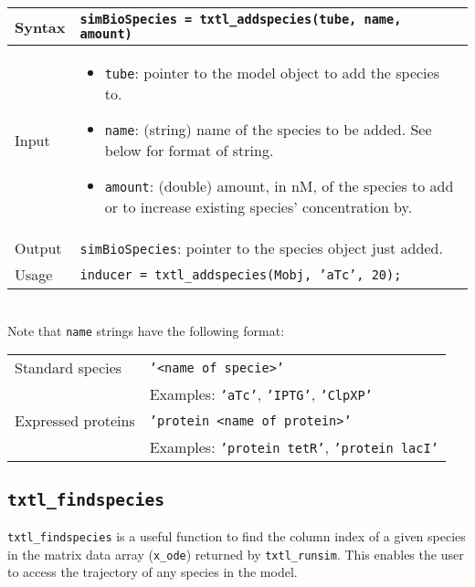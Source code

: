 			\begin{tabular}{p{2cm}|p{13cm}}
			Syntax & \texttt{simBioSpecies = txtl\_addspecies(tube, name, amount)}\\ \hline
			Input &  \begin{itemize}
				\item \texttt{tube}: pointer to the model object to add the species to.
				\item \texttt{name}: (string) name of the species to be added. See below for format of string.  
				\item \texttt{amount}: (double) amount, in nM, of the species to add or to increase existing species' concentration by. 
				\end{itemize} \\ \hline
			Output & \texttt{simBioSpecies}: pointer to the species object just added.\\ \hline
			Usage & \texttt{inducer = txtl\_addspecies(Mobj, 'aTc', 20);}\\
			\end{tabular} \\
			
			
			Note that \texttt{name} strings have the following format: \\
			
			\begin{tabular}{|p{2cm}|p{13cm}|}
			\hline
			Standard species & \texttt{'<name of specie>'}\\ 
			& Examples: \texttt{'aTc'},  \texttt{'IPTG'},  \texttt{'ClpXP'} \\ \hline
			Expressed proteins & \texttt{'protein <name of protein>'} \\
			& Examples: \texttt{'protein tetR'},  \texttt{'protein lacI'} \\ \hline
			\end{tabular}
					
					
		\subsection*{\texttt{txtl\_findspecies}}
			\texttt{txtl\_findspecies} is a useful function to find the column index of a given species in the matrix data array (\texttt{x\_ode}) returned by \texttt{txtl\_runsim}. This enables the user to access the trajectory of any species in the model. \\
			
